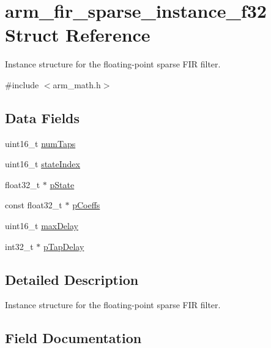 \hypertarget{structarm__fir__sparse__instance__f32}{}\section{arm\+\_\+fir\+\_\+sparse\+\_\+instance\+\_\+f32 Struct Reference}
\label{structarm__fir__sparse__instance__f32}


Instance structure for the floating-\/point sparse F\+IR filter.  




{\ttfamily \#include $<$arm\+\_\+math.\+h$>$}

\subsection*{Data Fields}
\begin{DoxyCompactItemize}
\item 
uint16\+\_\+t \mbox{\hyperlink{structarm__fir__sparse__instance__f32_a751941891e47f522a7f5375fe8990aac}{num\+Taps}}
\item 
uint16\+\_\+t \mbox{\hyperlink{structarm__fir__sparse__instance__f32_a566a0cb53437e48b9a3bf18e5b03d8aa}{state\+Index}}
\item 
float32\+\_\+t $\ast$ \mbox{\hyperlink{structarm__fir__sparse__instance__f32_a335c87e6fdc4b96601d95a5de8b9c463}{p\+State}}
\item 
const float32\+\_\+t $\ast$ \mbox{\hyperlink{structarm__fir__sparse__instance__f32_a39230f04a29d8321948e339633780442}{p\+Coeffs}}
\item 
uint16\+\_\+t \mbox{\hyperlink{structarm__fir__sparse__instance__f32_ab25f4ee7550e6d92acff77ada283733f}{max\+Delay}}
\item 
int32\+\_\+t $\ast$ \mbox{\hyperlink{structarm__fir__sparse__instance__f32_adec00b3793ab4f08edfeb4ea6a9eb6e6}{p\+Tap\+Delay}}
\end{DoxyCompactItemize}


\subsection{Detailed Description}
Instance structure for the floating-\/point sparse F\+IR filter. 

\subsection{Field Documentation}
\mbox{\label{structarm__fir__sparse__instance__f32_ab25f4ee7550e6d92acff77ada283733f}} 
